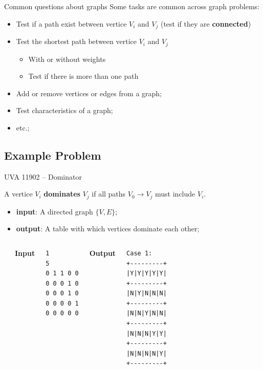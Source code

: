 \begin{frame}{Common questions about graphs}
  Some tasks are common across graph problems:
  \begin{itemize}
    \item Test if a path exist between vertice $V_i$ and $V_j$ (test if they are {\bf connected})
    \item Test the shortest path between vertice $V_i$ and $V_j$
    \begin{itemize}
      \item With or without weights
      \item Test if there is more than one path
    \end{itemize}
    \item Add or remove vertices or edges from a graph;
    \item Test characteristics of a graph;
    \item etc.;
  \end{itemize}
\end{frame}

\subsection{Example Problem}

\begin{frame}[fragile]{UVA 11902 -- Dominator}
  \begin{block}{}
    A vertice $V_i$ {\bf dominates} $V_j$ if all paths $V_0 \to V_j$ must include $V_i$.
    \begin{itemize}
      \item {\bf input}: A directed graph $\{V,E\}$;
      \item {\bf output}: A table with which vertices dominate each other;
    \end{itemize}
  \end{block}
\begin{columns}[T]
    \begin{center}
      
    \end{center}
      {\bf Input}
\begin{verbatim}
1
5
0 1 1 0 0
0 0 0 1 0
0 0 0 1 0
0 0 0 0 1
0 0 0 0 0
\end{verbatim}
{\bf Output}
{\smaller
\begin{verbatim}
Case 1:
+---------+
|Y|Y|Y|Y|Y|
+---------+
|N|Y|N|N|N|
+---------+
|N|N|Y|N|N|
+---------+
|N|N|N|Y|Y|
+---------+
|N|N|N|N|Y|
+---------+
\end{verbatim}}
  \end{columns}
\end{frame}


